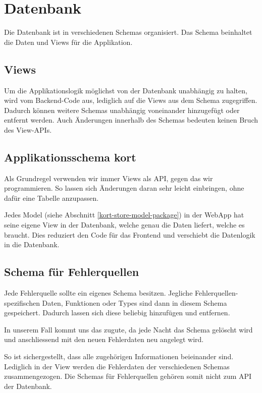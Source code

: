 \section{Datenbank}
Die Datenbank ist in verschiedenen Schemas organisiert.
Das Schema  beinhaltet die Daten und Views für die Applikation.

\subsection{Views}
Um die Applikationslogik möglichst von der Datenbank unabhängig zu halten, wird vom Backend-Code aus, lediglich auf die Views aus dem Schema  zugegriffen.
Dadurch können weitere Schemas unabhängig voneinander hinzugefügt oder entfernt werden.
Auch Änderungen innerhalb des Schemas bedeuten keinen Bruch des View-\glspl{API}.

\subsection{Applikationsschema kort}
Als Grundregel verwenden wir immer Views als \gls{API}, gegen das wir programmieren.
So lassen sich Änderungen daran sehr leicht einbringen, ohne dafür eine Tabelle anzupassen.

Jedes Model (siehe Abschnitt \ref{kort-store-model-package})  in der \gls{WebApp} hat seine eigene View in der Datenbank, welche genau die Daten liefert, welche es braucht.
Dies reduziert den Code für das Frontend und verschiebt die Datenlogik in die Datenbank.

\subsection{Schema für Fehlerquellen}
Jede Fehlerquelle sollte ein eigenes Schema besitzen.
Jegliche Fehlerquellen-spezifischen Daten, Funktionen oder Types sind dann in diesem Schema gespeichert.
Dadurch lassen sich diese beliebig hinzufügen und entfernen.

In unserem Fall kommt uns das zugute, da jede Nacht das  Schema gelöscht wird und anschliessend mit den neuen Fehlerdaten neu angelegt wird.

So ist sichergestellt, dass alle zugehörigen Informationen beieinander sind.
Lediglich in der View  werden die Fehlerdaten der verschiedenen Schemas zusammengezogen.
Die Schemas für Fehlerquellen gehören somit nicht zum \gls{API} der Datenbank.

